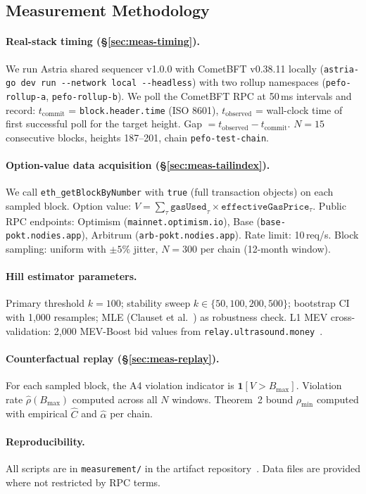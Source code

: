 
\subsection{Measurement Methodology}
\label{app:measurement}

\paragraph{Real-stack timing (\S\ref{sec:meas-timing}).}
We run Astria shared sequencer v1.0.0 with CometBFT v0.38.11 locally
(\verb|astria-go dev run --network local --headless|) with two rollup
namespaces (\texttt{pefo-rollup-a}, \texttt{pefo-rollup-b}).
We poll the CometBFT RPC at 50\,ms intervals and record:
$t_{\text{commit}}$ = \texttt{block.header.time} (ISO 8601),
$t_{\text{observed}}$ = wall-clock time of first successful poll for the
target height. Gap $= t_{\text{observed}} - t_{\text{commit}}$. $N=15$
consecutive blocks, heights 187--201, chain \texttt{pefo-test-chain}.

\paragraph{Option-value data acquisition (\S\ref{sec:meas-tailindex}).}
We call \texttt{eth\_getBlockByNumber} with \texttt{true} (full transaction
objects) on each sampled block. Option value:
$V = \sum_\tau \texttt{gasUsed}_\tau \times \texttt{effectiveGasPrice}_\tau$.
Public RPC endpoints: Optimism (\texttt{mainnet.optimism.io}),
Base (\texttt{base-pokt.nodies.app}),
Arbitrum (\texttt{arb-pokt.nodies.app}).
Rate limit: 10\,req/s. Block sampling: uniform with $\pm 5\%$ jitter,
$N=300$ per chain (12-month window).

\paragraph{Hill estimator parameters.}
Primary threshold $k=100$; stability sweep $k \in \{50, 100, 200, 500\}$;
bootstrap CI with 1,000 resamples; MLE (Clauset et al.~\cite{Clauset2009})
as robustness check. L1 MEV cross-validation: 2,000 MEV-Boost bid values
from \texttt{relay.ultrasound.money}~\cite{ultrasound-relay}.

\paragraph{Counterfactual replay (\S\ref{sec:meas-replay}).}
For each sampled block, the A4 violation indicator is
$\mathbf{1}[V > B_{\max}]$. Violation rate $\hat{\rho}(B_{\max})$ computed
across all $N$ windows. Theorem~2 bound $\rho_{\min}$ computed with
empirical $\hat{C}$ and $\hat{\alpha}$ per chain.

\paragraph{Reproducibility.}
All scripts are in \texttt{measurement/} in the artifact
repository~\cite{artifact-repo}. Data files are provided where not
restricted by RPC terms.
